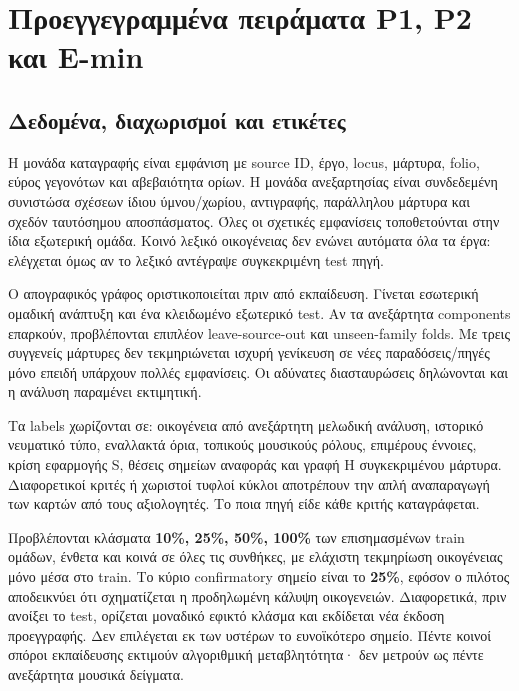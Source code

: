 \documentclass[
  10pt,
  a4paper,
]{report}
\begin{document}
\chapter{Προεγγεγραμμένα πειράματα P1, P2 και
E-min}\label{ux3c0ux3c1ux3bfux3b5ux3b3ux3b3ux3b5ux3b3ux3c1ux3b1ux3bcux3bcux3adux3bdux3b1-ux3c0ux3b5ux3b9ux3c1ux3acux3bcux3b1ux3c4ux3b1-p1-p2-ux3baux3b1ux3b9-e-min}

\section{Δεδομένα, διαχωρισμοί και
ετικέτες}\label{ux3b4ux3b5ux3b4ux3bfux3bcux3adux3bdux3b1-ux3b4ux3b9ux3b1ux3c7ux3c9ux3c1ux3b9ux3c3ux3bcux3bfux3af-ux3baux3b1ux3b9-ux3b5ux3c4ux3b9ux3baux3adux3c4ux3b5ux3c2}

Η μονάδα καταγραφής είναι εμφάνιση με source ID, έργο, locus, μάρτυρα,
folio, εύρος γεγονότων και αβεβαιότητα ορίων. Η μονάδα ανεξαρτησίας
είναι συνδεδεμένη συνιστώσα σχέσεων ίδιου ύμνου/χωρίου, αντιγραφής,
παράλληλου μάρτυρα και σχεδόν ταυτόσημου αποσπάσματος. Όλες οι σχετικές
εμφανίσεις τοποθετούνται στην ίδια εξωτερική ομάδα. Κοινό λεξικό
οικογένειας δεν ενώνει αυτόματα όλα τα έργα: ελέγχεται όμως αν το λεξικό
αντέγραψε συγκεκριμένη test πηγή.

Ο απογραφικός γράφος οριστικοποιείται πριν από εκπαίδευση. Γίνεται
εσωτερική ομαδική ανάπτυξη και ένα κλειδωμένο εξωτερικό test. Αν τα
ανεξάρτητα components επαρκούν, προβλέπονται επιπλέον leave-source-out
και unseen-family folds. Με τρεις συγγενείς μάρτυρες δεν τεκμηριώνεται
ισχυρή γενίκευση σε νέες παραδόσεις/πηγές μόνο επειδή υπάρχουν πολλές
εμφανίσεις. Οι αδύνατες διασταυρώσεις δηλώνονται και η ανάλυση παραμένει
εκτιμητική.

Τα labels χωρίζονται σε: οικογένεια από ανεξάρτητη μελωδική ανάλυση,
ιστορικό νευματικό τύπο, εναλλακτά όρια, τοπικούς μουσικούς ρόλους,
επιμέρους έννοιες, κρίση εφαρμογής S, θέσεις σημείων αναφοράς και γραφή
H συγκεκριμένου μάρτυρα. Διαφορετικοί κριτές ή χωριστοί τυφλοί κύκλοι
αποτρέπουν την απλή αναπαραγωγή των καρτών από τους αξιολογητές. Το ποια
πηγή είδε κάθε κριτής καταγράφεται.

Προβλέπονται κλάσματα \textbf{10\%, 25\%, 50\%, 100\%} των επισημασμένων
train ομάδων, ένθετα και κοινά σε όλες τις συνθήκες, με ελάχιστη
τεκμηρίωση οικογένειας μόνο μέσα στο train. Το κύριο confirmatory σημείο
είναι το \textbf{25\%}, εφόσον ο πιλότος αποδεικνύει ότι σχηματίζεται η
προδηλωμένη κάλυψη οικογενειών. Διαφορετικά, πριν ανοίξει το test,
ορίζεται μοναδικό εφικτό κλάσμα και εκδίδεται νέα έκδοση προεγγραφής.
Δεν επιλέγεται εκ των υστέρων το ευνοϊκότερο σημείο. Πέντε κοινοί σπόροι
εκπαίδευσης εκτιμούν αλγοριθμική μεταβλητότητα· δεν μετρούν ως πέντε
ανεξάρτητα μουσικά δείγματα.
\end{document}
